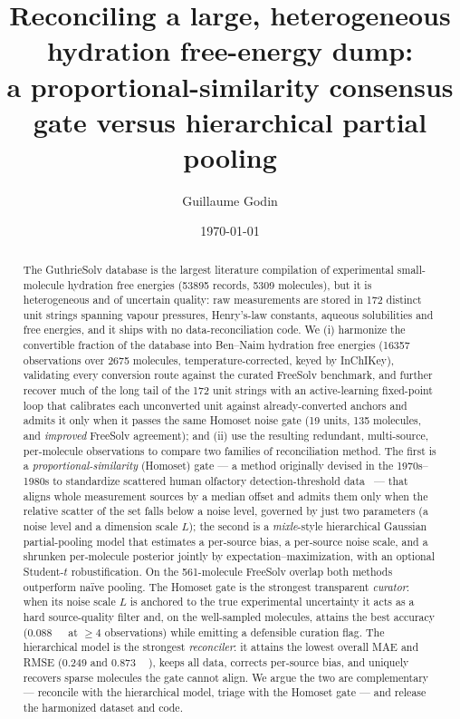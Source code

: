 \documentclass[11pt]{article}
\title{\bfseries Reconciling a large, heterogeneous hydration free-energy dump:\\
a proportional-similarity consensus gate versus hierarchical partial pooling}
\author[1]{Guillaume Godin}
\affil[1]{Osmo Labs \quad\texttt{guillaume@osmo.ai}}
\date{\today}
\newcommand{\kcal}{\,\mathrm{kcal\,mol^{-1}}}
\begin{document}
\maketitle

\begin{abstract}
\noindent
The GuthrieSolv database is the largest literature compilation of experimental
small-molecule hydration free energies (\num{53895} records, \num{5309} molecules),
but it is heterogeneous and of uncertain quality: raw measurements are stored in
172 distinct unit strings spanning vapour pressures, Henry's-law constants,
aqueous solubilities and free energies, and it ships with no data-reconciliation
code. We (i) harmonize the convertible fraction of the database into Ben--Naim
hydration free energies (\num{16357} observations over \num{2675} molecules,
temperature-corrected, keyed by InChIKey), validating every conversion route
against the curated FreeSolv benchmark, and further recover much of the long tail of the 172
unit strings with an active-learning fixed-point loop that calibrates each unconverted unit against
already-converted anchors and admits it only when it passes the same Homoset noise gate
(\num{19} units, \num{+135} molecules, and \emph{improved} FreeSolv agreement); and (ii) use the resulting redundant,
multi-source, per-molecule observations to compare two families of reconciliation
method. The first is a \emph{proportional-similarity} (Homoset) gate --- a method originally devised in
the 1970s--1980s to standardize scattered human olfactory detection-threshold
data~\cite{devos1990} --- that aligns
whole measurement sources by a median offset and admits them only when the relative scatter of
the set falls below a noise level, governed by just two parameters (a noise level and a
dimension scale $L$); the
second is a \emph{mixle}-style hierarchical Gaussian partial-pooling model that
estimates a per-source bias, a per-source noise scale, and a shrunken per-molecule
posterior jointly by expectation--maximization, with an optional Student-$t$
robustification. On the 561-molecule FreeSolv overlap both methods outperform
naïve pooling. The Homoset gate is the strongest transparent \emph{curator}: when its noise scale
$L$ is anchored to the true experimental uncertainty it acts as a hard source-quality filter and,
on the well-sampled molecules, attains the best accuracy (\SI{0.088}{\kcal} at $\ge4$ observations)
while emitting a defensible curation flag. The hierarchical model is the strongest
\emph{reconciler}: it attains the lowest overall MAE and RMSE (\SI{0.249}{} and \SI{0.873}{\kcal}),
keeps all data, corrects per-source bias, and uniquely recovers sparse molecules the gate cannot
align. We argue the two are complementary --- reconcile with
the hierarchical model, triage with the Homoset gate --- and release the
harmonized dataset and code.
\end{abstract}
\end{document}
